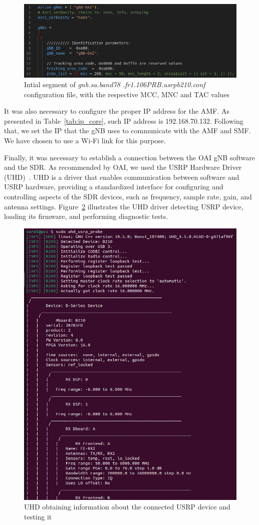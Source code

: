 \begin{figure}[H]
    \centering
    \includegraphics[width=0.7\linewidth]{figures/gnb_conf}
    \caption{Intial segment of \textit{gnb.sa.band78
    .fr1.106PRB.usrpb210.conf} configuration file, with the respective MCC, MNC and TAC values}
    \label{fig:gnb_conf}
\end{figure}

It was also necessary to configure the proper IP address for the AMF\@.
As presented in Table~\ref{tab:ip_core}, such IP address is 192.168.70.132.
Following that, we set the IP that the gNB uses to communicate with the AMF and SMF\@.
We have chosen to use a Wi-Fi link for this purpose.


Finally, it was necessary to establish a connection between the OAI gNB software and the SDR\@.
As recommended by OAI, we used the USRP Hardware Driver (UHD)~\cite{uhdusrpdriver}.
UHD is a driver that enables communication between software and USRP hardware, providing a standardized interface for configuring and controlling aspects of the SDR devices, such as frequency, sample rate, gain, and antenna settings.
Figure~\ref{fig:uhd_probe} illustrates the UHD driver detecting USRP device, loading its firmware, and performing diagnostic tests.

\begin{figure}[H]
    \centering
    \includegraphics[width=0.5\linewidth]{figures/uhd_usrp_probe}
    \caption{UHD obtaining information about the connected USRP device and testing it}
    \label{fig:uhd_probe}
\end{figure}

